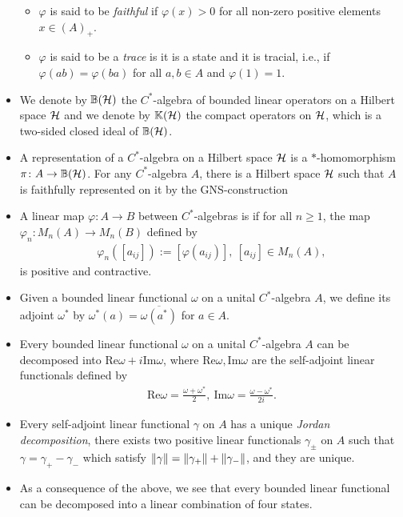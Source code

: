 \begin{itemize}
\begin{itemize}
\item $\varphi$ is said to be \emph{faithful} if $\varphi(x) > 0$ for all non-zero positive elements $x \in (A)_+$.
\item $\varphi$ is said to be a \emph{trace} is it is a state and it is tracial, i.e., if $\varphi(ab)=\varphi(ba)$ for all $a,b \in A$ and $\varphi(1)=1$.
\end{itemize}
\item We denote by $\mathbb{B}(\mathcal{H})$ the $C^*$-algebra of bounded linear operators on a Hilbert space $\mathcal{H}$ and we denote by $\mathbb{K}(\mathcal{H})$ the compact operators on $\mathcal{H}$, which is a two-sided closed ideal of $\mathbb{B}(\mathcal{H})$.
\item A representation of a $C^*$-algebra on a Hilbert space $\mathcal{H}$ is a $*$-homomorphism $\pi \colon A \to \mathbb{B}(\mathcal{H})$. For any $C^*$-algebra $A$, there is a Hilbert space $\mathcal{H}$ such that $A$ is faithfully represented on it by the GNS-construction \cite[Thoerem 14.4][87]{zhu}
\item A linear map $\varphi \colon A \to B$ between $C^*$-algebras is  if for all $n \geq 1$, the map $\varphi_n \colon M_n(A) \to M_n(B)$ defined by
\begin{align*}
\varphi_n([a_{ij}]):=[\varphi(a_{ij})], \ [a_{ij}] \in M_n(A),
\end{align*}
is positive and contractive.
\item Given a bounded linear functional $\omega$ on a unital $C^*$-algebra $A$, we define its adjoint $\omega^*$ by $\omega^*(a)=\overline{\omega(a^*)}$ for $a \in A$.
\item Every bounded linear functional $\omega$ on a unital $C^*$-algebra $A$ can be decomposed into $\mathrm{Re}\omega+i \mathrm{Im}\omega$, where $\mathrm{Re}\omega, \mathrm{Im}\omega$ are the self-adjoint linear functionals defined by
\begin{align*}
\mathrm{Re}\omega=\frac{\omega+\omega^*}{2}, \ \mathrm{Im}\omega = \frac{\omega-\omega^*}{2i}.
\end{align*}
\item Every self-adjoint linear functional $\gamma$ on $A$ has a unique \emph{Jordan decomposition}, there exists two positive linear functionals $\gamma_{\pm}$ on $A$ such that $\gamma=\gamma_+-\gamma_-$ which satisfy $\left\lVert \gamma \right\rVert = \left\lVert \gamma_+\right\rVert + \left\lVert \gamma_-\right\rVert$, and they are unique.
\item As a consequence of the above, we see that every bounded linear functional can be decomposed into a linear combination of four states.
\end{itemize}
